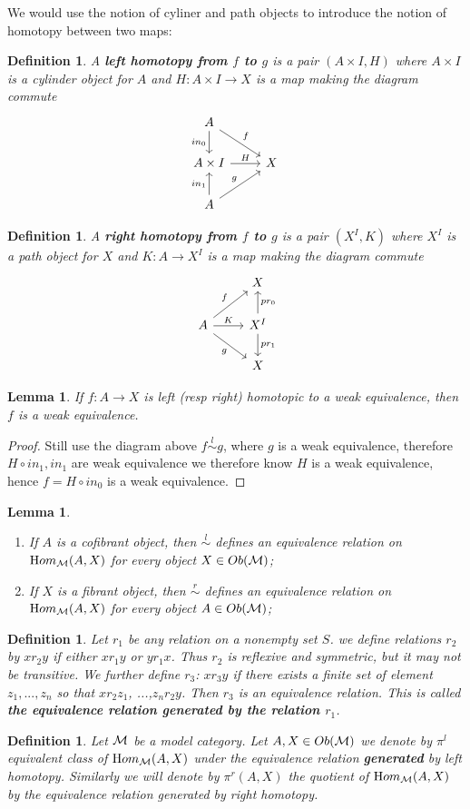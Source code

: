 \documentclass[11pt]{article}
\newtheorem{lemma}[thm]{Lemma}
\newtheorem{dfn}[thm]{Definition}
\renewcommand{\hom}{{\text Hom}}
\newcommand{\calm}{{\cal M}}
\newcommand{\lrta}{\longrightarrow}
\begin{document}
We would use the notion of cyliner and path objects to introduce the notion of homotopy between two maps:
\begin{dfn}
 A \textbf{left homotopy from $f$ to $g$} is a pair $(A\times I, H)$ where $A\times I$ is a cylinder object for $A$ and $H:A\times I\lrta X$ is a map making the diagram commute 
 $$
 \begin{tikzcd}
A \arrow[d, "in_0"'] \arrow[rd, "f"] &  \\
A\times I \arrow[r, "H"] & X \\
A \arrow[u, "in_1"] \arrow[ru, "g"] & 
\end{tikzcd}
 $$
\end{dfn}
\begin{dfn}
A \textbf{ right homotopy from $f$ to $g$} is a pair $(X^I,K)$ where $X^{I}$ is a path object for $X$ and $K:A\lrta X^I$ is a map making the diagram commute 
$$
\begin{tikzcd}
 & X \\
A \arrow[r, "K"] \arrow[ru, "f"] \arrow[rd, "g"'] & X^I \arrow[u, "pr_0"'] \arrow[d, "pr_1"] \\
 & X
\end{tikzcd}
$$
\end{dfn}
\begin{lemma}
If $f:A\lrta X$ is left (resp right) homotopic to a weak equivalence, then $f$ is a weak equivalence.
\end{lemma}
\begin{proof}
Still use the diagram above $f\overset{l}{\sim} g$, where $g$ is a weak equivalence, therefore $H\circ in_1, in_1$ are weak equivalence we therefore know $H$ is a weak equivalence, hence $f=H\circ in_0$ is a weak equivalence.
\end{proof}
\begin{lemma}\ \begin{enumerate}
\item 
If $A$ is a cofibrant object, then $\overset{l}{\sim}$ defines an equivalence relation on $\hom_\calm(A,X)$ for every object $X\in Ob(\calm)$;
\item
If $X$ is a fibrant object, then $\overset{r}{\sim}$ defines an equivalence relation on $\hom_\calm(A,X)$ for every object $A\in Ob(\calm)$;
\end{enumerate}
\end{lemma}
\begin{dfn}
Let $r_1$ be any relation on a nonempty set $S$. we define relations $r_2$ by $x r_2 y$ if either $xr_1 y$ or $yr_1 x$. Thus $r_2$ is reflexive and symmetric, but it may not be transitive. We further define $r_3$: $xr_3 y$ if there exists a finite set of element $z_1,...,z_n$ so that $x r_2 z_1$, ...,$z_n r_2 y$. Then $r_3$ is an equivalence relation. This is called \textbf{the equivalence relation generated by the relation $r_1$}.
\end{dfn}
\begin{dfn}
Let $\calm$ be a model category. Let $A,X\in Ob(\calm)$ we denote by $\pi^l$ equivalent class of $\hom_\calm(A,X)$ under the equivalence relation \textbf{generated} by left homotopy. Similarly we will denote by $\pi^r(A,X)$ the quotient of $\hom_\calm(A,X)$ by the equivalence relation generated by right homotopy.
\end{dfn}
\end{document}

